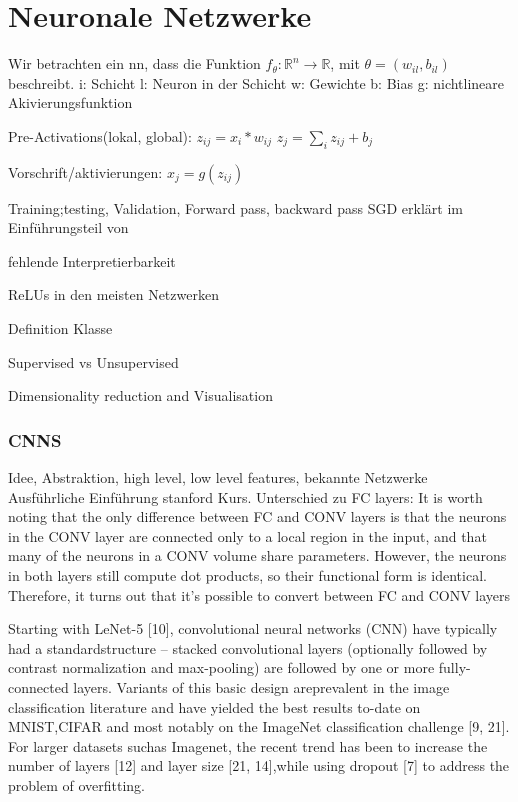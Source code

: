 \documentclass[twoside, 12pt,a4paper]{article}
\numberwithin{equation}{section}
\begin{document}
	\section{Neuronale Netzwerke} \label{chapter_nn}
	Wir betrachten ein \gls{nn}, dass die Funktion $f_{\theta}:\mathbb{R}^n \to\mathbb{R}$, mit $\theta = (w_{il}, b_{il})$ beschreibt. 
	i: Schicht
	l: Neuron in der Schicht
	w: Gewichte 
	b: Bias
	g: nichtlineare Akivierungsfunktion
	
	Pre-Activations(lokal, global): $z_{ij} = x_i*w_{ij}$
	$z_j = \sum_iz_{ij} + b_j$
	
	Vorschrift/aktivierungen: $x_j = g(z_{ij})$
	
	
	Training;testing, Validation, Forward pass, backward pass
	SGD erklärt im Einführungsteil von \cite{BatchNormalization}

	fehlende Interpretierbarkeit
	
	ReLUs in den meisten Netzwerken
	
	Definition Klasse
	
	Supervised vs Unsupervised
	
	Dimensionality reduction and Visualisation
	
	
	\subsubsection{CNNS}
	Idee, Abstraktion, high level, low level features, bekannte Netzwerke\\
	
	Ausführliche Einführung stanford Kurs\cite{cnn_stanford}. Unterschied zu FC layers: 
	It is worth noting that the only difference between FC and CONV layers is that the neurons in the CONV layer are connected only to a local region in the input, and that many of the neurons in a CONV volume share parameters. However, the neurons in both layers still compute dot products, so their functional form is identical. Therefore, it turns out that it’s possible to convert between FC and CONV layers
	
	Starting with LeNet-5   [10], convolutional neural networks (CNN) have typically had a standardstructure – stacked convolutional layers (optionally followed by contrast normalization and max-pooling)  are  followed  by  one  or  more  fully-connected  layers.   Variants  of  this  basic  design  areprevalent in the image classification literature and have yielded the best results to-date on MNIST,CIFAR and most notably on the ImageNet classification challenge [9, 21].  For larger datasets suchas Imagenet, the recent trend has been to increase the number of layers  [12] and layer size [21, 14],while using dropout [7] to address the problem of overfitting.\cite{goingdeeperwithconvolutions}
	
\end{document}
